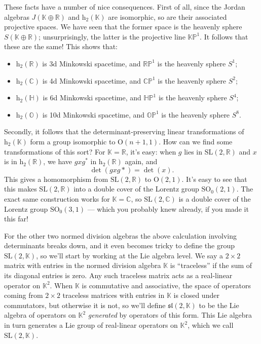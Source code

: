 \documentclass{article}
\def\tightlist{}
\begin{document}
These facts have a number of nice consequences. First of all, since the
Jordan algebras \(J(\mathbb{K}\oplus\mathbb{R})\) and
\(\mathrm{h}_2(\mathbb{K})\) are isomorphic, so are their associated
projective spaces. We have seen that the former space is the heavenly
sphere \(S(\mathbb{K}\oplus\mathbb{R})\); unsurprisingly, the latter is
the projective line \(\mathbb{KP}^1\). It follows that these are the
same! This shows that:

\begin{itemize}
\tightlist
\item
  \(\mathrm{h}_2(\mathbb{R})\) is 3d Minkowski spacetime, and
  \(\mathbb{RP}^1\) is the heavenly sphere \(S^1\);
\item
  \(\mathrm{h}_2(\mathbb{C})\) is 4d Minkowski spacetime, and
  \(\mathbb{CP}^1\) is the heavenly sphere \(S^2\);
\item
  \(\mathrm{h}_2(\mathbb{H})\) is 6d Minkowski spacetime, and
  \(\mathbb{HP}^1\) is the heavenly sphere \(S^4\);
\item
  \(\mathrm{h}_2(\mathbb{O})\) is 10d Minkowski spacetime, and
  \(\mathbb{OP}^1\) is the heavenly sphere \(S^8\).
\end{itemize}

Secondly, it follows that the determinant-preserving linear
transformations of \(\mathrm{h}_2(\mathbb{K})\) form a group isomorphic
to \(\mathrm{O}(n+1,1)\). How can we find some transformations of this
sort? For \(\mathbb{K}=\mathbb{R}\), it's easy: when \(g\) lies in
\(\mathrm{SL}(2,\mathbb{R})\) and \(x\) is in
\(\mathrm{h}_2(\mathbb{R})\), we have \(gxg^*\) in
\(\mathrm{h}_2(\mathbb{R})\) again, and \[\det(gxg*) = \det(x).\] This
gives a homomorphism from \(\mathrm{SL}(2,\mathbb{R})\) to
\(\mathrm{O}(2,1)\). It's easy to see that this makes
\(\mathrm{SL}(2,\mathbb{R})\) into a double cover of the Lorentz group
\(\mathrm{SO}_0(2,1)\). The exact same construction works for
\(\mathbb{K}=\mathbb{C}\), so \(\mathrm{SL}(2,\mathbb{C})\) is a double
cover of the Lorentz group \(\mathrm{SO}_0(3,1)\) --- which you probably
knew already, if you made it this far!

For the other two normed division algebras the above calculation
involving determinants breaks down, and it even becomes tricky to define
the group \(\mathrm{SL}(2,\mathbb{K})\), so we'll start by working at
the Lie algebra level. We say a \(2\times2\) matrix with entries in the
normed division algebra \(\mathbb{K}\) is ``traceless'' if the sum of
its diagonal entries is zero. Any such traceless matrix acts as a
real-linear operator on \(\mathbb{K}^2\). When \(\mathbb{K}\) is
commutative and associative, the space of operators coming from
\(2\times2\) traceless matrices with entries in \(\mathbb{K}\) is closed
under commutators, but otherwise it is not, so we'll define
\(\mathfrak{sl}(2,\mathbb{K})\) to be the Lie algebra of operators on
\(\mathbb{K}^2\) \emph{generated} by operators of this form. This Lie
algebra in turn generates a Lie group of real-linear operators on
\(\mathbb{K}^2\), which we call \(\mathrm{SL}(2,\mathbb{K})\).
\end{document}
